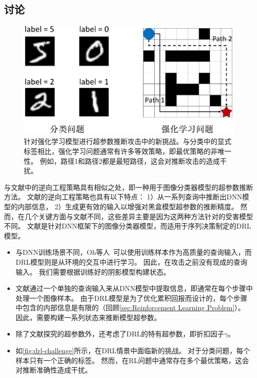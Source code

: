 \subsection{讨论}
\begin{figure}[!h]
    \centering
    \includegraphics[width=0.6\hsize]{figure/drl_hypertheif/fig-drl-challengech.pdf}
    \caption{针对强化学习模型进行超参数推断攻击中的新挑战。与分类中的显式标签相比，强化学习问题通常有许多等效策略，即最优策略的非唯一性。
    例如，路径1和路径2都是最短路径，这会对推断攻击的造成干扰。} 
    \label{fig:drl-challenge}
\end{figure}

\sysname 与文献{\rm\parencite{OASF18}}中的逆向工程策略具有相似之处，即一种用于图像分类器模型的超参数推断方法。
文献{\rm\parencite{OASF18}}的逆向工程策略也具有以下特点：
1）从一系列查询中推断出DNN模型的内部信息，
2）生成更有效的输入以增强对黑盒模型超参数的推断精度。
然而，\sysname 在几个关键方面与文献{\rm\parencite{OASF18}}不同，这些差异主要是因为这两种方法针对的受害模型不同。
文献{\rm\parencite{OASF18}}是针对DNN框架下的图像分类器模型，而\sysname 适用于序列决策制定的DRL模型。

\begin{itemize}
    \item {}
    与DNN训练场景不同，Oh等人~\cite{OASF18}可以使用训练样本作为高质量的查询输入，而DRL模型则是从环境的交互中进行学习。
    因此，在攻击之前\sysname 没有现成的查询输入。
    我们需要根据训练好的阴影模型构建状态。
    \item {} 
    文献{\rm\parencite{OASF18}}通过一个单独的查询输入来从DNN模型中提取信息，即通常在每个步骤中处理一个图像样本。
    由于DRL模型是为了优化累积回报而设计的，每个步骤中包含的内部信息是有限的（回顾\autoref{sec:Reinforcement Learning Problem}）。
    因此，\sysname 需要构建一系列状态来推断模型超参数。
    \item {} 
    除了文献{\rm\parencite{OASF18}}探究的超参数外，\sysname 还考虑了DRL的特有超参数，即折扣因子$\gamma$。
    \item {} 
    如\autoref{fig:drl-challenge}所示，\sysname 在DRL情景中面临新的挑战。
    对于分类问题，每个样本只有一个正确的标签。
    然而，在RL问题中通常存在多个最优策略，这会对推断准确性造成干扰。
\end{itemize}

